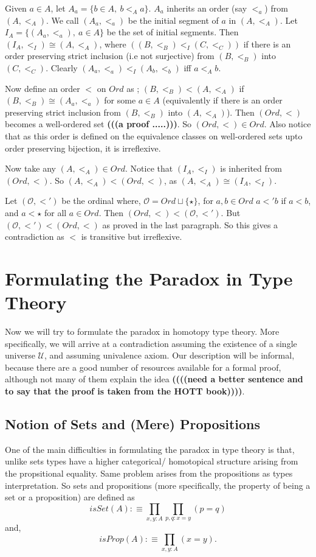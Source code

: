 \documentclass[11pt]{article}
\theoremstyle{definition}
\theoremstyle{plain}
\theoremstyle{remark}
\newcommand{\U}{\mathscr{U}}
\begin{document}
Given $a\in A$, let $A_a = \{b \in A,\ b <_A a \}$. $A_a$ inherits an order (say $<_a$)
from $(A, <_A)$. We call $(A_a, <_a)$ be the initial segment of $a$ in $(A, <_A)$. Let
$I_A = \{(A_a, <_a),\ a\in A\}$ be the set of initial segments. Then 
$(I_A,<_I) \cong (A, <_A)$, where $((B,<_B) <_I (C,<_C))$ if there is an order preserving 
strict inclusion (i.e not surjective) from $(B,<_B)$ into $(C,<_C)$. Clearly 
$(A_a,<_a) <_I (A_b,<_b)$ iff $a <_A b$.\smallskip

Now define an order $<$ on $Ord$ as ; $(B,<_B) < (A, <_A)$ if $(B, <_B) \cong (A_a, <_a)$ 
for some $a \in A$ (equivalently if there is an order preserving strict inclusion 
from $(B,<_B)$ into $(A,<_A)$). Then $(Ord, <)$ becomes a well-ordered set 
\textbf{(((a proof .....)))}. So $(Ord, <) \in Ord$. Also notice that as this order is defined 
on the equivalence classes on well-ordered sets upto order preserving bijection, it is 
irreflexive.\smallskip

Now take any $(A, <_A)\in Ord$. Notice that $(I_A, <_I)$ is inherited from ${(Ord, <)}$. So
$(A, <_A) < (Ord, <)$, as $(A,<_A) \cong (I_A, <_I)$.\smallskip

Let $(\mathcal{O}, <')$ be the ordinal where, $\mathcal{O} = Ord\sqcup \{\star\}$, for 
$a,b\in Ord$ $a<'b$ if $a<b$, and $a<\star$ for all $a\in Ord$. Then 
$(Ord,<)< (\mathcal{O},<')$. But $(\mathcal{O},<')<(Ord,<)$ as proved in the last paragraph.
So this gives a contradiction as $<$ is transitive but irreflexive. 

\section{Formulating the Paradox in Type Theory}\label{S:Form in TT}

Now we will try to formulate the paradox in homotopy type theory. More specifically, 
we will arrive at a contradiction assuming the existence of a single universe $\U$, and
assuming univalence axiom. Our description will be informal, because there are a good number 
of resources available for a formal proof, although not many of them explain the idea 
\textbf{((((need a better sentence and to say that the proof is taken from
the HOTT book))))}.\smallskip

\subsection{Notion of Sets and (Mere) Propositions}
One of the main difficulties in formulating the paradox in type theory is that, unlike sets
types have a higher categorical/ homotopical structure arising from the propsitional 
equality. Same problem arises from the propositions as types interpretation. So sets and 
propositions (more specifically, the property of being a set or a proposition) are defined as
\[ isSet(A) :\equiv \prod_{x,y:A} \prod_{p,q : x = y} (p=q)\] and,
\[ isProp(A) :\equiv \prod_{x,y:A} (x = y).\]
\end{document}
